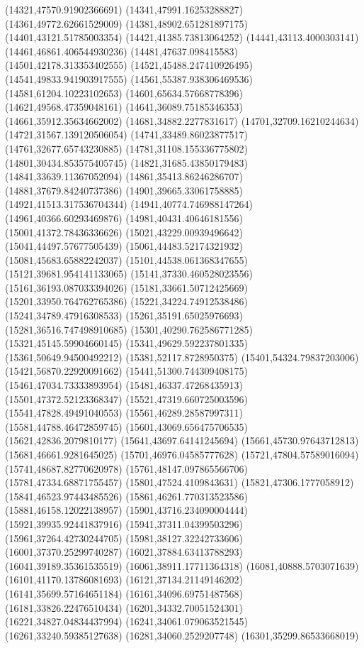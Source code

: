 {(14321,47570.91902366691)
(14341,47991.16253288827)
(14361,49772.62661529009)
(14381,48902.651281897175)
(14401,43121.51785003354)
(14421,41385.73813064252)
(14441,43113.4000303141)
(14461,46861.406544930236)
(14481,47637.098415583)
(14501,42178.313353402555)
(14521,45488.247410926495)
(14541,49833.941903917555)
(14561,55387.938306469536)
(14581,61204.10223102653)
(14601,65634.57668778396)
(14621,49568.47359048161)
(14641,36089.75185346353)
(14661,35912.35634662002)
(14681,34882.2277831617)
(14701,32709.16210244634)
(14721,31567.139120506054)
(14741,33489.86023877517)
(14761,32677.65743230885)
(14781,31108.155336775802)
(14801,30434.853575405745)
(14821,31685.43850179483)
(14841,33639.11367052094)
(14861,35413.86246286707)
(14881,37679.84240737386)
(14901,39665.33061758885)
(14921,41513.317536704344)
(14941,40774.746988147264)
(14961,40366.60293469876)
(14981,40431.40646181556)
(15001,41372.78436336626)
(15021,43229.00939496642)
(15041,44497.57677505439)
(15061,44483.52174321932)
(15081,45683.65882242037)
(15101,44538.061368347655)
(15121,39681.954141133065)
(15141,37330.460528023556)
(15161,36193.087033394026)
(15181,33661.50712425669)
(15201,33950.764762765386)
(15221,34224.74912538486)
(15241,34789.47916308533)
(15261,35191.65025976693)
(15281,36516.747498910685)
(15301,40290.762586771285)
(15321,45145.59904660145)
(15341,49629.592237801335)
(15361,50649.94500492212)
(15381,52117.8728950375)
(15401,54324.79837203006)
(15421,56870.22920091662)
(15441,51300.744309408175)
(15461,47034.73333893954)
(15481,46337.47268435913)
(15501,47372.52123368347)
(15521,47319.660725003596)
(15541,47828.49491040553)
(15561,46289.28587997311)
(15581,44788.46472859745)
(15601,43069.656475706535)
(15621,42836.2079810177)
(15641,43697.64141245694)
(15661,45730.97643712813)
(15681,46661.9281645025)
(15701,46976.04585777628)
(15721,47804.57589016094)
(15741,48687.82770620978)
(15761,48147.097865566706)
(15781,47334.68871755457)
(15801,47524.4109843631)
(15821,47306.1777058912)
(15841,46523.97443485526)
(15861,46261.770313523586)
(15881,46158.12022138957)
(15901,43716.234090004444)
(15921,39935.92441837916)
(15941,37311.04399503296)
(15961,37264.42730244705)
(15981,38127.32242733606)
(16001,37370.25299740287)
(16021,37884.63413788293)
(16041,39189.35361535519)
(16061,38911.17711364318)
(16081,40888.5703071639)
(16101,41170.13786081693)
(16121,37134.21149146202)
(16141,35699.57164651184)
(16161,34096.69751487568)
(16181,33826.22476510434)
(16201,34332.70051524301)
(16221,34827.04834437994)
(16241,34061.079063521545)
(16261,33240.59385127638)
(16281,34060.2529207748)
(16301,35299.86533668019)
}
